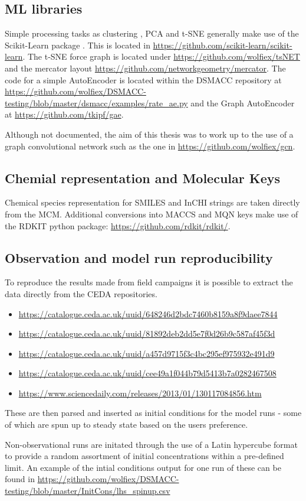 \subsection*{ML libraries}
Simple processing tasks as clustering , PCA and t-SNE generally make use of the Scikit-Learn package \citep{sklearn}. This is located in \url{https://github.com/scikit-learn/scikit-learn}. The t-SNE force graph is located under \url{https://github.com/wolfiex/tsNET} and the mercator layout \url{https://github.com/networkgeometry/mercator}.
The code for a simple AutoEncoder is located within the DSMACC repository at \url{https://github.com/wolfiex/DSMACC-testing/blob/master/dsmacc/examples/rate_ae.py} and the Graph AutoEncoder at \url{https://github.com/tkipf/gae}.


Although not documented, the aim of this thesis was to work up to the use of a graph convolutional network such as the one in \url{https://github.com/wolfiex/gcn}.

\subsection*{Chemial representation and Molecular Keys}
Chemical species representation for SMILES and InCHI strings are taken directly from the MCM. Additional conversions into MACCS and MQN keys make use of the RDKIT  python package: \citep{rdkit} \url{https://github.com/rdkit/rdkit/}.

\subsection{Observation and model run reproducibility}
To reproduce the results made from field campaigns it is possible to extract the data directly from the CEDA repositories.

\begin{itemize}
 \item{\url{https://catalogue.ceda.ac.uk/uuid/648246d2bdc7460b8159a8f9daee7844}}
 \item {\url{https://catalogue.ceda.ac.uk/uuid/81892deb2dd5e7f0d26b9c587af45f3d}}
 \item{\url{https://catalogue.ceda.ac.uk/uuid/a457d9715f3c4bc295ef975932e491d9}}
 \item {\url{https://catalogue.ceda.ac.uk/uuid/cee49a1f044b79d5413b7a0282467508}}
 \item {\url{https://www.sciencedaily.com/releases/2013/01/130117084856.htm}}
\end{itemize}

These are then parsed and inserted as initial conditions for the model runs - some of which are spun up to steady state based on the users preference.

Non-observational runs are initated through the use of a Latin hypercube format to provide a random assortment of initial concentrations within a pre-defined limit. An example of the intial conditions output for one run of these can be found in \url{https://github.com/wolfiex/DSMACC-testing/blob/master/InitCons/lhs_spinup.csv}

